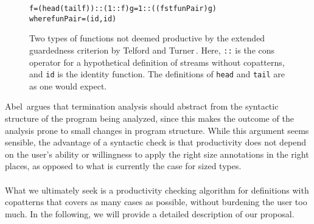 \begin{figure}
\begin{alltt}
f = (head (tail f)) :: (1 :: f)                 g = 1 :: ((fst funPair) g)
                                                where funPair = (id, id)
\end{alltt}
\caption{Two types of functions not deemed productive by the extended guardedness criterion by Telford and Turner\,\citep[Section 6.3]{Telford98ensuringthe}. Here, \texttt{::} is the cons operator for a hypothetical definition of streams without copatterns, and \texttt{id} is the identity function. The definitions of \texttt{head} and \texttt{tail} are as one would expect.} 
\label{fig:TelfordTurnerProblems}
\end{figure}

Abel\,\citep{Abel99terminationchecking} argues that termination analysis should abstract from the syntactic structure of the program being analyzed, since this makes the outcome of the analysis prone to small changes in program structure. While this argument seems sensible, the advantage of a syntactic check is that productivity does not depend on the user's ability or willingness to apply the right size annotations in the right places, as opposed to what is currently the case for sized types.

\paragraph{}
What we ultimately seek is a productivity checking algorithm for definitions with copatterns that covers as many cases as possible, without burdening the user too much. In the following, we will provide a detailed description of our proposal.

